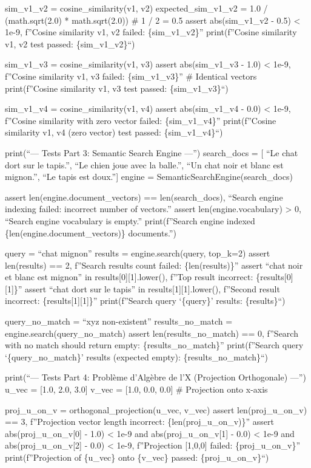\documentclass[11pt,a4paper]{report}
\begin{document}
sim\_v1\_v2 = cosine\_similarity(v1, v2) expected\_sim\_v1\_v2 = 1.0 /
(math.sqrt(2.0) * math.sqrt(2.0)) \# 1 / 2 = 0.5 assert abs(sim\_v1\_v2
- 0.5) \textless{} 1e-9, f''Cosine similarity v1, v2 failed:
\{sim\_v1\_v2\}'' print(f''Cosine similarity v1, v2 test passed:
\{sim\_v1\_v2\}``)

sim\_v1\_v3 = cosine\_similarity(v1, v3) assert abs(sim\_v1\_v3 - 1.0)
\textless{} 1e-9, f''Cosine similarity v1, v3 failed: \{sim\_v1\_v3\}''
\# Identical vectors print(f''Cosine similarity v1, v3 test passed:
\{sim\_v1\_v3\}``)

sim\_v1\_v4 = cosine\_similarity(v1, v4) assert abs(sim\_v1\_v4 - 0.0)
\textless{} 1e-9, f''Cosine similarity with zero vector failed:
\{sim\_v1\_v4\}'' print(f''Cosine similarity v1, v4 (zero vector) test
passed: \{sim\_v1\_v4\}``)

print(``\n--- Tests Part 3: Semantic Search Engine ---'') search\_docs =
{[} ``Le chat dort sur le tapis.'', ``Le chien joue avec la balle.'',
``Un chat noir et blanc est mignon.'', ``Le tapis est doux.''{]} engine
= SemanticSearchEngine(search\_docs)

assert len(engine.document\_vectors) == len(search\_docs), ``Search
engine indexing failed: incorrect number of vectors.'' assert
len(engine.vocabulary) \textgreater{} 0, ``Search engine vocabulary is
empty.'' print(f''Search engine indexed
\{len(engine.document\_vectors)\} documents.'')

query = ``chat mignon'' results = engine.search(query, top\_k=2) assert
len(results) == 2, f''Search results count failed: \{len(results)\}''
assert ``chat noir et blanc est mignon'' in
results{[}0{]}{[}1{]}.lower(), f''Top result incorrect:
\{results{[}0{]}{[}1{]}\}'' assert ``chat dort sur le tapis'' in
results{[}1{]}{[}1{]}.lower(), f''Second result incorrect:
\{results{[}1{]}{[}1{]}\}'' print(f''Search query `\{query\}' results:
\{results\}``)

query\_no\_match = ``xyz non-existent'' results\_no\_match =
engine.search(query\_no\_match) assert len(results\_no\_match) == 0,
f''Search with no match should return empty: \{results\_no\_match\}''
print(f''Search query `\{query\_no\_match\}' results (expected empty):
\{results\_no\_match\}``)

print(``\n--- Tests Part 4: Problème d'Algèbre de l'X (Projection
Orthogonale) ---'') u\_vec = {[}1.0, 2.0, 3.0{]} v\_vec = {[}1.0, 0.0,
0.0{]} \# Projection onto x-axis

proj\_u\_on\_v = orthogonal\_projection(u\_vec, v\_vec) assert
len(proj\_u\_on\_v) == 3, f''Projection vector length incorrect:
\{len(proj\_u\_on\_v)\}'' assert abs(proj\_u\_on\_v{[}0{]} - 1.0)
\textless{} 1e-9 and abs(proj\_u\_on\_v{[}1{]} - 0.0) \textless{} 1e-9
and abs(proj\_u\_on\_v{[}2{]} - 0.0) \textless{} 1e-9, f''Projection
{[}1,0,0{]} failed: \{proj\_u\_on\_v\}'' print(f''Projection of
\{u\_vec\} onto \{v\_vec\} passed: \{proj\_u\_on\_v\}``)
\end{document}
